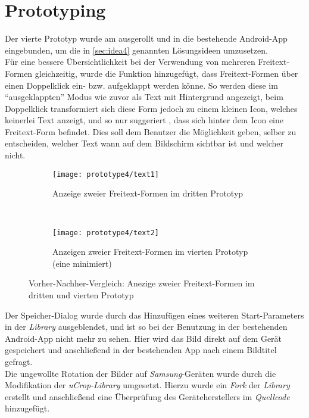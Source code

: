 \section{Prototyping}
Der vierte Prototyp wurde am  ausgerollt und in die bestehende Android-App eingebunden, um die in \autoref{sec:idea4} genannten Lösungsideen umzusetzen. \\

Für eine bessere Übersichtlichkeit bei der Verwendung von mehreren Freitext-Formen gleichzeitig, wurde die Funktion hinzugefügt, dass Freitext-Formen über einen Doppelklick ein- bzw. aufgeklappt werden könne.
So werden diese im ``ausgeklappten'' Modus wie zuvor als Text mit Hintergrund angezeigt, beim Doppelklick transformiert sich diese Form jedoch zu einem kleinen Icon, welches keinerlei Text anzeigt, und so nur suggeriert , dass sich hinter dem Icon eine Freitext-Form befindet. 
Dies soll dem Benutzer die Möglichkeit geben, selber zu entscheiden, welcher Text wann auf dem Bildschirm sichtbar ist und welcher nicht. \\

\begin{figure}[h]
  \begin{subfigure}[t]{0.4\textwidth}
    \centering
    \texttt{[image: prototype4/text1]}
    \caption{Anzeige zweier Freitext-Formen im dritten Prototyp}
  \end{subfigure}
  ~
  \begin{subfigure}[t]{0.4\textwidth}
    \centering
    \texttt{[image: prototype4/text2]}
    \caption{Anzeigen zweier Freitext-Formen im vierten Prototyp (eine minimiert)}
  \end{subfigure}
  \centering
  \caption{Vorher-Nachher-Vergleich: Anezige zweier Freitext-Formen im dritten und vierten Prototyp}
  \label{fig:texts}
\end{figure}

Der Speicher-Dialog wurde durch das Hinzufügen eines weiteren Start-Parameters in der \emph{Library} ausgeblendet, und ist so bei der Benutzung in der bestehenden Android-App nicht mehr zu sehen.
Hier wird das Bild direkt auf dem Gerät gespeichert und anschließend in der bestehenden App nach einem Bildtitel gefragt. \\

Die ungewollte Rotation der Bilder auf \emph{Samsung}-Geräten wurde durch die Modifikation der \emph{uCrop-Library} umgesetzt.
Hierzu wurde ein \emph{Fork} der \emph{Library} erstellt und anschließend eine Überprüfung des Geräteherstellers im \emph{Quellcode} hinzugefügt.

